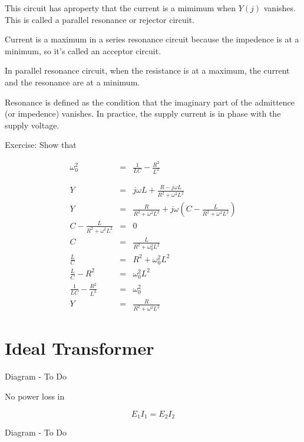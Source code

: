 \documentclass[a4paper,12pt]{article}
\begin{document}
This circuit has aproperty that the current is a mimimum when $Y(j)$
vanishes. This is called a parallel resonance or rejector circuit.

Current is a maximum in a series resonance circuit because the impedence
is at a minimum, so it's called an acceptor circuit.

In  parallel resonance circuit, when the resistance is at a maximum, the
current and the resonance are at a minimum.

Resonance is defined as the condition that the imaginary part of the
admittence (or impedence) vanishes. In practice, the supply current is
in phase with the supply voltage.

Exercise: Show that

\begin{eqnarray*}
\omega_{0}^{2} & = & \frac{1}{LC} - \frac{R^{2}}{L^{2}} \\
& & \\
& & \\
Y & = & j \omega L + \frac{R - j \omega L}{R^{2} + \omega^{2} L^{2}} \\
Y & = & \frac{R}{R^{2} + \omega^{2} L^{2}} + j \omega \left(C -
\frac{L}{R^{2} + \omega^{2} L^{2}} \right) \\
C - \frac{L}{R^{2} + \omega^{2} L^{2}} & = & 0 \\
C & = & \frac{L}{R^{2} + \omega_{0}^{2} L^{2}} \\
\frac{L}{C} & = & R^{2} + \omega_{0}^{2} L^{2} \\
\frac{L}{C} - R^{2} & = & \omega_{0}^{2} L^{2} \\
\frac{1}{LC} - \frac{R^{2}}{L^{2}} & = & \omega_{0}^{2} \\
Y & = & \frac{R}{R^{2} + \omega^{2} L^{2}}
\end{eqnarray*}


\section{Ideal Transformer}

\begin{table}[hbtp]

Diagram - To Do

\end{table}

No power loss in

\[ E_{1} I_{1} = E_{2} I_{2} \]

\begin{table}[hbtp]

Diagram - To Do

\end{table}
\end{document}
